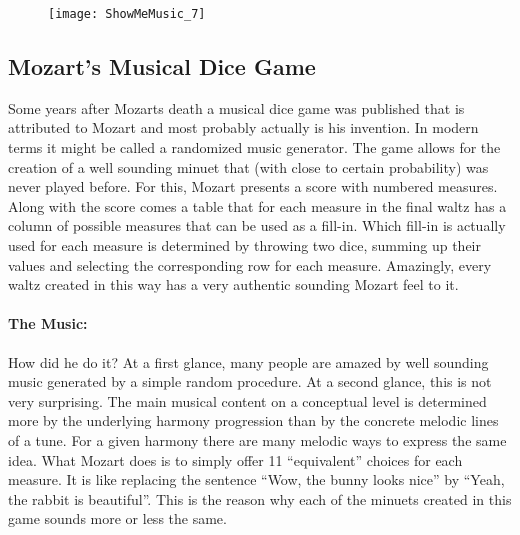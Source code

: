

\begin{figure}[t]
\centering
\texttt{[image: ShowMeMusic\_7]}
\end{figure}


\subsection{Mozart's Musical Dice Game}
Some years after Mozarts death a musical dice game was published that is attributed to Mozart and most probably actually is his invention. In modern terms it might be called a randomized music generator. The game allows for the creation of a well sounding minuet that (with close to certain probability) was never played before. For this, Mozart presents a score with numbered measures. Along with the score comes a table that for each measure in the final waltz has a column of possible measures that can be used as a fill-in. Which fill-in is actually used for each measure is determined by throwing two dice, summing up their values and selecting the corresponding row for each measure. Amazingly, every waltz created in this way has a very authentic sounding Mozart feel to it.

\paragraph{The Music:} How did he do it? At a first glance, many people are amazed by well sounding music generated by a simple random procedure. At a second glance, this is not very surprising. The main musical content on a conceptual level is determined more by the underlying harmony progression than by the concrete melodic lines of a tune. For a given harmony there are many melodic ways to express the same idea. What Mozart does is to simply offer 11 ``equivalent'' choices for each measure. It is like replacing the sentence ``Wow, the bunny looks nice'' by ``Yeah, the rabbit is beautiful''. This is the reason why each of the minuets created in this game sounds more or less the same.

